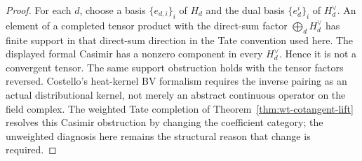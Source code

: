 \documentclass[11pt]{memoir}
\begin{document}
\begin{proof}
  For each $d$, choose a basis $\{e_{d,i}\}_i$ of $H_d$ and the dual basis
  $\{e^i_d\}_i$ of $H_d^\vee$. An element of a completed tensor product with
  the direct-sum factor $\bigoplus_d H_d^\vee$ has finite support in that
  direct-sum direction in the Tate convention used here. The displayed formal
  Casimir has a nonzero component in every $H_d^\vee$. Hence it is not a
  convergent tensor. The same support obstruction holds with the tensor factors
  reversed. Costello's heat-kernel BV formalism requires the inverse pairing as
  an actual distributional kernel, not merely an abstract continuous operator on
  the field complex. The weighted Tate completion of
  Theorem~\ref{thm:wt-cotangent-lift} resolves this Casimir obstruction by
  changing the coefficient category; the unweighted diagnosis here remains
  the structural reason that change is required.
\end{proof}
\end{document}
